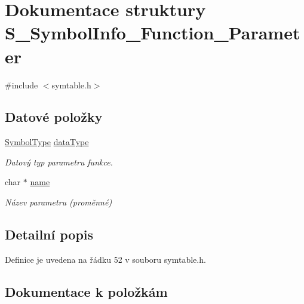 \hypertarget{struct_s___symbol_info___function___parameter}{}\section{Dokumentace struktury S\+\_\+\+Symbol\+Info\+\_\+\+Function\+\_\+\+Parameter}
\label{struct_s___symbol_info___function___parameter}


{\ttfamily \#include $<$symtable.\+h$>$}

\subsection*{Datové položky}
\begin{DoxyCompactItemize}
\item 
\hyperlink{symtable_8h_a623952f6aa67a355a3840e25272b1c91}{Symbol\+Type} \hyperlink{struct_s___symbol_info___function___parameter_af756a2b49adaf952b3035eafa97ad150}{data\+Type}
\begin{DoxyCompactList}\small\item\em Datový typ parametru funkce. \end{DoxyCompactList}\item 
char $\ast$ \hyperlink{struct_s___symbol_info___function___parameter_a5ac083a645d964373f022d03df4849c8}{name}
\begin{DoxyCompactList}\small\item\em Název parametru (proměnné) \end{DoxyCompactList}\end{DoxyCompactItemize}


\subsection{Detailní popis}


Definice je uvedena na řádku 52 v souboru symtable.\+h.



\subsection{Dokumentace k položkám}
\mbox{\label{struct_s___symbol_info___function___parameter_af756a2b49adaf952b3035eafa97ad150}} 
